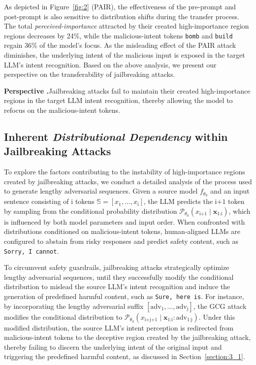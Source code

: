 As depicted in Figure~\ref{fig:2} (PAIR), the effectiveness of the pre-prompt and post-prompt is also sensitive to distribution shifts during the transfer process.
The total \emph{perceived-importance} attracted by their created high-importance region regions decreases by 24\%, while the malicious-intent tokens \texttt{bomb} and \texttt{build} regain 36\% of the model's focus.
As the misleading effect of the PAIR attack diminishes, the underlying intent of the malicious input is exposed in the target LLM's intent recognition.
Based on the above analysis, we present our perspective on the transferability of jailbreaking attacks.

\begin{mdframed}[backgroundcolor=RefColor!15,linecolor=white,skipabove=6pt,skipbelow=0pt,innerleftmargin=3pt,innerrightmargin=3pt]
\textbf{Perspective \uppercase\expandafter{}.}\hspace*{2mm}Jailbreaking attacks fail to maintain their created high-importance regions in the target LLM intent recognition, thereby allowing the model to refocus on the malicious-intent tokens.
\end{mdframed}
\vspace{-0.8em}

\subsection{Inherent \emph{Distributional Dependency} within Jailbreaking Attacks}
\label{section:3_3}

To explore the factors contributing to the instability of high-importance regions created by jailbreaking attacks, we conduct a detailed analysis of the process used to generate lengthy adversarial sequences.
Given a source model $f_{\theta_\text{S}}$ and an input sentence consisting of $\text{i}$ tokens $\mathbb{S} = [x_1, \ldots, x_\text{i}]$, the LLM predicts the $\text{i+1}$ token by sampling from the conditional probability distribution $\mathcal{P}_{\theta_{\text{S}}}(x_{\text{i+1}} \mid \mathbf{x}_{\text{1:i}})$, which is influenced by both model parameters and input order.
When confronted with distributions conditioned on malicious-intent tokens, human-aligned LLMs are configured to abstain from risky responses and predict safety content, such as \texttt{Sorry, I cannot}.

To circumvent safety guardrails, jailbreaking attacks strategically optimize lengthy adversarial sequences, until they successfully modify the conditional distribution to mislead the source LLM's intent recognition and induce the generation of predefined harmful content, such as \texttt{Sure, here is}.
For instance, by incorporating the lengthy adversarial suffix $[\text{adv}_1, \ldots, \text{adv}_\text{j}]$, the GCG attack modifies the conditional distribution to $\mathcal{P}_{\theta{_\text{S}}}(x_{\text{i+j+1}} \mid \mathbf{x}_{\text{1:i}}:\text{adv}_{\text{1:j}})$.
Under this modified distribution, the source LLM's intent perception is redirected from malicious-intent tokens to the deceptive region created by the jailbreaking attack, thereby failing to discern the underlying intent of the original input and triggering the predefined harmful content, as discussed in Section~\ref{section:3_1}. 


